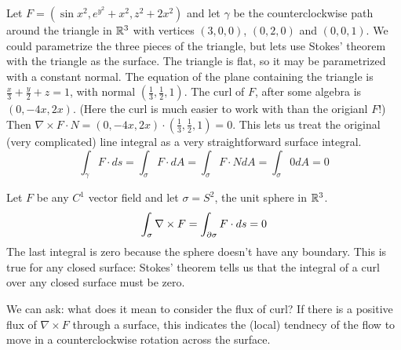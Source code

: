 \documentclass[fleqn,letterpaper]{report}
\begin{document}
\begin{example}
Let $F = (\sin x^2, e^{y^2} + x^2, z^2 +
2x^2)$ and let $\gamma$ be the counterclockwise path around
the triangle in $\mathbb{R}^3$ with vertices $(3,0,0)$, $(0,2,0)$ and
$(0,0,1)$. We could parametrize the three pieces of the
triangle, but lets use Stokes' theorem with the triangle as
the surface. The triangle is flat, so it may be parametrized
with a constant
normal. The equation of the plane containing the triangle is
$\frac{x}{3} + \frac{y}{2} + z = 1$, with normal $\left(
\frac{1}{3}, \frac{1}{2}, 1 \right)$. The curl of $F$, after
some algebra is $(0, -4x, 2x)$. (Here the curl is much easier
to work with than the origianl $F$!) Then $\nabla \times F
\cdot N = (0, -4x, 2x) \cdot \left( \frac{1}{3}, \frac{1}{2},
1 \right) = 0$. This lets us treat the original (very
complicated) line integral as a very straightforward surface
integral.
\begin{equation*}
\int_\gamma F \cdot ds = \int_{\sigma} F \cdot dA =
\int_\sigma F \cdot N dA = \int_{\sigma} 0 dA = 0
\end{equation*}
\end{example}

\begin{example}
Let $F$ be any $C^1$ vector field and let $\sigma = S^2$, the
unit sphere in $\mathbb{R}^3$. 
\begin{equation*}
\int_{\sigma} \nabla \times F = \int_{\partial \sigma} F \cdot ds
= 0 
\end{equation*}
The last integral is zero because the sphere doesn't have any
boundary. This is true for any closed surface: Stokes'
theorem tells us that the integral of a curl over any closed
surface must be zero. 
\end{example}

We can ask: what does it mean to consider the flux of curl?
If there is a positive flux of $\nabla \times F$ through a
surface, this indicates the (local) tendnecy of the flow to
move in a counterclockwise rotation across the surface.
\end{document}
